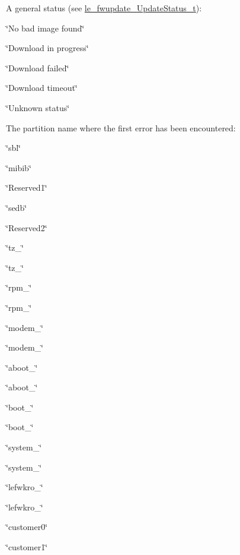 \begin{DoxyItemize}
\item A general status (see \hyperlink{le__fwupdate__interface_8h_a8749c3532db083893e9dd2d7c128a027}{le\+\_\+fwupdate\+\_\+\+Update\+Status\+\_\+t})\+:
\begin{DoxyItemize}
\item \char`\"{}\+No bad image found\char`\"{}
\item \char`\"{}\+Download in progress\char`\"{}
\item \char`\"{}\+Download failed\char`\"{}
\item \char`\"{}\+Download timeout\char`\"{}
\item \char`\"{}\+Unknown status\char`\"{}
\end{DoxyItemize}
\item The partition name where the first error has been encountered\+:
\begin{DoxyItemize}
\item \char`\"{}sbl\char`\"{}
\item \char`\"{}mibib\char`\"{}
\item \char`\"{}\+Reserved1\char`\"{}
\item \char`\"{}sedb\char`\"{}
\item \char`\"{}\+Reserved2\char`\"{}
\item \char`\"{}tz\+\_\char`\"{}
\item \char`\"{}tz\+\_\char`\"{}
\item \char`\"{}rpm\+\_\char`\"{}
\item \char`\"{}rpm\+\_\char`\"{}
\item \char`\"{}modem\+\_\char`\"{}
\item \char`\"{}modem\+\_\char`\"{}
\item \char`\"{}aboot\+\_\char`\"{}
\item \char`\"{}aboot\+\_\char`\"{}
\item \char`\"{}boot\+\_\char`\"{}
\item \char`\"{}boot\+\_\char`\"{}
\item \char`\"{}system\+\_\char`\"{}
\item \char`\"{}system\+\_\char`\"{}
\item \char`\"{}lefwkro\+\_\char`\"{}
\item \char`\"{}lefwkro\+\_\char`\"{}
\item \char`\"{}customer0\char`\"{}
\item \char`\"{}customer1\char`\"{}
\end{DoxyItemize}
\end{DoxyItemize}





